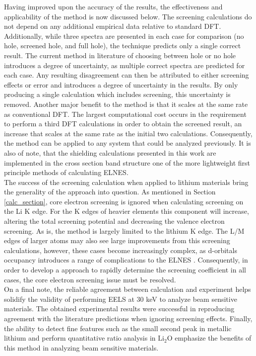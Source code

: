 Having improved upon the accuracy of the results, the effectiveness and applicability of the method is now discussed below. The screening calculations do not depend on any additional empirical data relative to standard DFT.  Additionally, while three spectra are presented in each case for comparison (no hole, screened hole, and full hole), the technique predicts only a single correct result.  The current method in literature of choosing between hole or no hole introduces a degree of uncertainty, as multiple correct spectra are predicted for each case.   Any resulting disagreement can then be attributed to either screening effects or error and introduces a degree of uncertainty in the results. By only producing a single calculation which includes screening, this uncertainty is removed.  Another major benefit to the method is that it scales at the same rate as conventional DFT.  The largest computational cost occurs in the requirement to perform a third DFT calculations in order to obtain the screened result, an increase that scales at the same rate as the initial two calculations.  Consequently, the method can be applied to any system that could be analyzed previously.  It is also of note, that the shielding calculations presented in this work are implemented in the cross section band structure one of the more lightweight first principle methods of calculating ELNES.\\

The success of the screening calculation when applied to lithium materials bring the generality of the approach into question.  As mentioned in Section \ref{calc_section}, core electron screening is ignored when calculating screening on the Li K edge.  For the K edges of heavier elements this component will increase, altering the total screening potential and decreasing the valence electron screening.  As is, the method is largely limited to the lithium K edge.  The L/M edges of larger atoms may also see large improvements from this screening calculations, however, these cases become increasingly complex, as d-orbitals occupancy introduces a range of complications to the ELNES \cite{hubbard_electron_1963}. Consequently, in order to develop a approach to rapidly determine the screening coefficient in all cases, the core electron screening issue must be resolved.  \\


On a  final note, the reliable agreement between calculation and experiment helps solidify the validity of performing EELS at 30 keV to analyze beam sensitive materials.  The obtained experimental results were successful in reproducing agreement with the literature predictions when ignoring screening effects.  Finally, the ability to detect fine features such as the small second peak in metallic lithium and perform quantitative ratio analysis in $ \mathrm{Li_2O} $ emphasize the benefits of this method in analyzing beam sensitive materials.  \\








